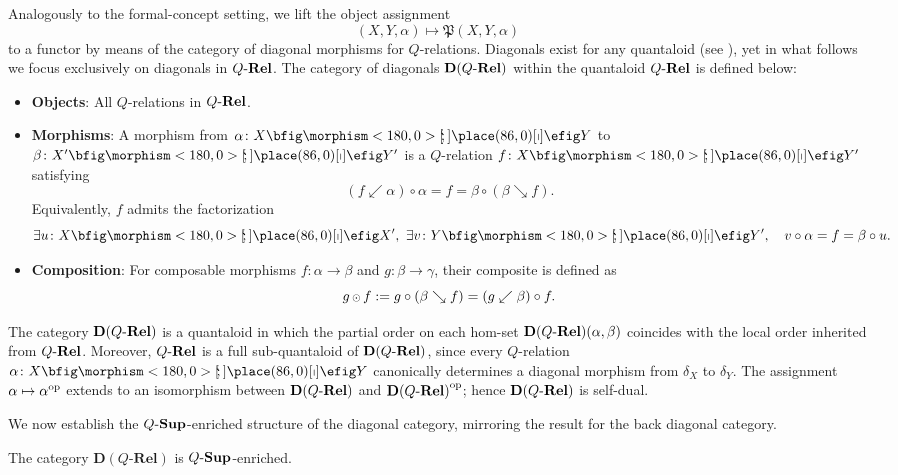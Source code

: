 \documentclass{tac}
\begin{document}
Analogously to the formal-concept setting, we lift the object assignment  $$(X,Y,\alpha)\mapsto\mathfrak{P}(X,Y,\alpha)$$ to a functor by means of the category of diagonal morphisms for $Q$-relations. Diagonals exist for any quantaloid (see \cite{Stubbe2014}), yet in what follows we focus exclusively on diagonals in \(Q\text{-}\mathbf{Rel}\). The category of diagonals \({\mathbf{D}(Q\text{-}\mathbf{Rel})}\) within the quantaloid \(Q\text{-}\mathbf{Rel}\) is defined below:
\begin{itemize}
\item \textbf{Objects}: All $Q$-relations in $Q\text{-}\mathbf{Rel}$.
\item \textbf{Morphisms}: A morphism from $\alpha\colon X\nto Y$ to $\beta\colon X'\nto Y'$ is a $Q$-relation $f\colon X\nto Y'$ satisfying
\[
(f\swarrow\alpha)\circ\alpha=f=\beta\circ(\beta\searrow f).
\]
Equivalently, $f$ admits the factorization
\[
\exists u\colon X\nto X',\ \exists v\colon Y\nto Y',\quad v\circ\alpha=f=\beta\circ u.
\]
\item \textbf{Composition}: For composable morphisms $f\colon\alpha\to\beta$ and $g\colon\beta\to\gamma$, their composite is defined as
\[
g{\,{\scriptstyle\odot}\,} f:=g\circ(\beta\searrow f)=(g\swarrow\beta)\circ f.
\]
\end{itemize}

The category \({\mathbf{D}(Q\text{-}\mathbf{Rel})}\) is a quantaloid in which the partial order on each hom-set \({\mathbf{D}(Q\text{-}\mathbf{Rel})}(\alpha,\beta)\) coincides with the local order inherited from \(Q\text{-}\mathbf{Rel}\). Moreover, \(Q\text{-}\mathbf{Rel}\) is a full sub-quantaloid of \({\mathbf{D}(Q\text{-}\mathbf{Rel})}\), since every \(Q\)-relation \(\alpha\colon X\nto Y\) canonically determines a diagonal morphism from \(\delta_X\) to \(\delta_Y\). The assignment \(\alpha\mapsto\alpha^{\mathrm{op}}\) extends to an isomorphism between \({\mathbf{D}(Q\text{-}\mathbf{Rel})}\) and \({\mathbf{D}(Q\text{-}\mathbf{Rel})}^{\mathrm{op}}\); hence \({\mathbf{D}(Q\text{-}\mathbf{Rel})}\) is self-dual. 

We now establish the ${Q\text{-}\mathbf{Sup}}$-enriched structure of the diagonal category, mirroring the result for the back diagonal category.

\begin{proposition} \label{prop:d-enriched}
The category $\mathbf{D}(Q\text{-}\mathbf{Rel})$ is ${Q\text{-}\mathbf{Sup}}$-enriched.
\end{proposition}
\end{document}
